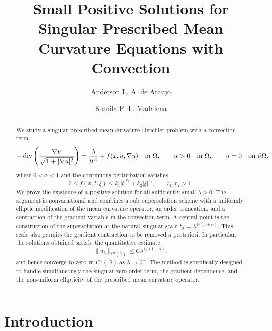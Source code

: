 \documentclass[11pt,leqno]{amsart}
\title[Small Positive Solutions for Singular Mean Curvature Equations]
{Small Positive Solutions for Singular Prescribed Mean Curvature Equations with Convection}
\author{Anderson L. A. de Araujo}
\author{Kamila F. L. Madalena}
\date{}
\begin{document}
\begin{abstract}
We study a singular prescribed mean curvature
Dirichlet problem with a convection term,
\[
-\operatorname{div}\left(\frac{\nabla u}{\sqrt{1+|\nabla u|^2}}\right)
=\frac{\lambda}{u^\alpha}+f(x,u,\nabla u)
\quad\hbox{in }\Omega,\qquad
u>0\quad\hbox{in }\Omega,\qquad
u=0\quad\hbox{on }\partial\Omega,
\]
where $0<\alpha<1$ and the continuous perturbation satisfies
\[
0\le f(x,t,\xi)\le k_1|t|^{r_1}+k_2|\xi|^{r_2},
\qquad r_1,r_2>1.
\]
We prove the existence of a positive solution for all sufficiently small
$\lambda>0$. The argument is nonvariational and combines a
sub--supersolution scheme with a uniformly elliptic modification of the
mean curvature operator, an order truncation, and a contraction of the
gradient variable in the convection term. A central point is the
construction of the supersolution at the natural singular scale
$t_\lambda=\lambda^{1/(1+\alpha)}$. This scale also permits the gradient
contraction to be removed a posteriori. In particular, the solutions
obtained satisfy the quantitative estimate
\[
\|u_\lambda\|_{C^1(\overline\Omega)}
\le C\lambda^{1/(1+\alpha)},
\]
and hence converge to zero in $C^1(\overline\Omega)$ as
$\lambda\to0^+$. The method is specifically designed to handle
simultaneously the singular zero-order term, the gradient dependence,
and the non-uniform ellipticity of the prescribed mean curvature
operator.
\end{abstract}


\maketitle


\section{Introduction}
\end{document}
